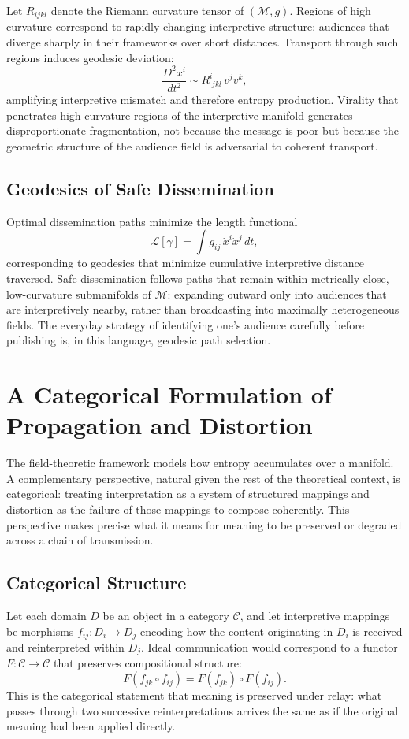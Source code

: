 \documentclass[12pt,a4paper]{article}
\begin{document}
Let $R_{ijkl}$ denote the Riemann curvature tensor of $(\mathcal{M}, g)$. Regions of high curvature correspond to rapidly changing interpretive structure: audiences that diverge sharply in their frameworks over short distances. Transport through such regions induces geodesic deviation:
\[
\frac{D^2 x^i}{dt^2} \sim R^i_{\;jkl}\, v^j v^k,
\]
amplifying interpretive mismatch and therefore entropy production. Virality that penetrates high-curvature regions of the interpretive manifold generates disproportionate fragmentation, not because the message is poor but because the geometric structure of the audience field is adversarial to coherent transport.

\subsection{Geodesics of Safe Dissemination}

Optimal dissemination paths minimize the length functional
\[
\mathcal{L}[\gamma] = \int g_{ij}\, \dot{x}^i \dot{x}^j\, dt,
\]
corresponding to geodesics that minimize cumulative interpretive distance traversed. Safe dissemination follows paths that remain within metrically close, low-curvature submanifolds of $\mathcal{M}$: expanding outward only into audiences that are interpretively nearby, rather than broadcasting into maximally heterogeneous fields. The everyday strategy of identifying one's audience carefully before publishing is, in this language, geodesic path selection.

\section{A Categorical Formulation of Propagation and Distortion}

The field-theoretic framework models how entropy accumulates over a manifold. A complementary perspective, natural given the rest of the theoretical context, is categorical: treating interpretation as a system of structured mappings and distortion as the failure of those mappings to compose coherently. This perspective makes precise what it means for meaning to be preserved or degraded across a chain of transmission.

\subsection{Categorical Structure}

Let each domain $D$ be an object in a category $\mathcal{C}$, and let interpretive mappings be morphisms $f_{ij} : D_i \to D_j$ encoding how the content originating in $D_i$ is received and reinterpreted within $D_j$. Ideal communication would correspond to a functor $F : \mathcal{C} \to \mathcal{C}$ that preserves compositional structure:
\[
F(f_{jk} \circ f_{ij}) = F(f_{jk}) \circ F(f_{ij}).
\]
This is the categorical statement that meaning is preserved under relay: what passes through two successive reinterpretations arrives the same as if the original meaning had been applied directly.
\end{document}
